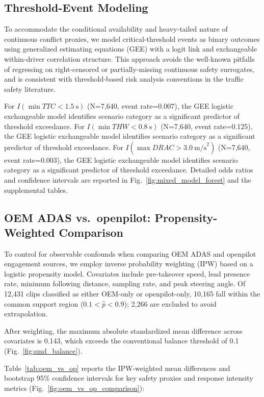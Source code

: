 \subsection{Threshold-Event Modeling}
\label{subsec:threshold_models}

To accommodate the conditional availability and heavy-tailed nature of continuous conflict proxies, we model critical-threshold events as binary outcomes using generalized estimating equations (GEE) with a logit link and exchangeable within-driver correlation structure. This approach avoids the well-known pitfalls of regressing on right-censored or partially-missing continuous safety surrogates, and is consistent with threshold-based risk analysis conventions in the traffic safety literature.

For $I(\min TTC < 1.5~\text{s})$ (N=7,640, event rate=0.007), the GEE logistic exchangeable model identifies scenario category as a significant predictor of threshold exceedance. 
For $I(\min THW < 0.8~\text{s})$ (N=7,640, event rate=0.125), the GEE logistic exchangeable model identifies scenario category as a significant predictor of threshold exceedance. 
For $I(\max DRAC > 3.0~\text{m/s}^2)$ (N=7,640, event rate=0.003), the GEE logistic exchangeable model identifies scenario category as a significant predictor of threshold exceedance. 
Detailed odds ratios and confidence intervals are reported in Fig.~\ref{fig:mixed_model_forest} and the supplemental tables.

\subsection{OEM ADAS vs.\ openpilot: Propensity-Weighted Comparison}
\label{subsec:oem_vs_op}

To control for observable confounds when comparing OEM ADAS and openpilot engagement sources, we employ inverse probability weighting (IPW) based on a logistic propensity model. Covariates include pre-takeover speed, lead presence rate, minimum following distance, sampling rate, and peak steering angle. Of 12,431 clips classified as either OEM-only or openpilot-only, 10,165 fall within the common support region ($0.1 < \hat{p} < 0.9$); 2,266 are excluded to avoid extrapolation.

After weighting, the maximum absolute standardized mean difference across covariates is 0.143, which exceeds the conventional balance threshold of 0.1 (Fig.~\ref{fig:smd_balance}).

Table~\ref{tab:oem_vs_op} reports the IPW-weighted mean differences and bootstrap 95\% confidence intervals for key safety proxies and response intensity metrics (Fig.~\ref{fig:oem_vs_op_comparison}):

